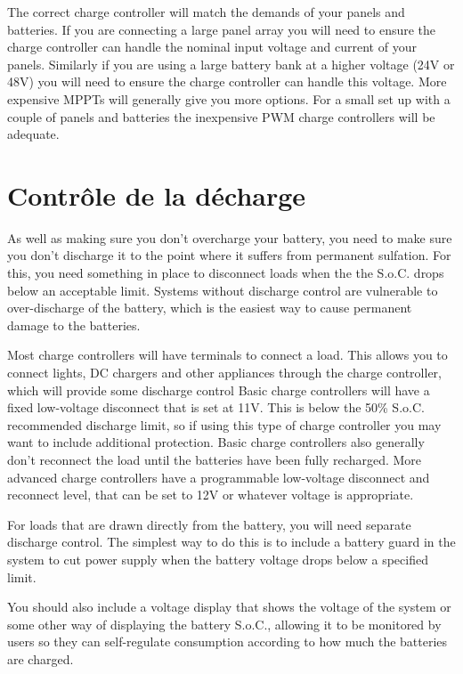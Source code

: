 \documentclass{article}
\theoremstyle{definition}
\theoremstyle{definition}
\theoremstyle{remark}
\begin{document}
    The correct charge controller will match the demands of your panels and batteries. If you are connecting a large panel array you will need to ensure the charge controller can handle the nominal input voltage and current of your panels. Similarly if you are using a large battery bank at a higher voltage (24V or 48V) you will need to ensure the charge controller can handle this voltage. More expensive MPPTs will generally give you more options. For a small set up with a couple of panels and batteries the inexpensive PWM charge controllers will be adequate. 
  


{\color{blue}\section{Contrôle de la décharge}} %
\label{sec:controle_de_la_decharge}

  As well as making sure you don’t overcharge your battery, you need to make sure you don’t discharge it to the point where it suffers from permanent sulfation. For this, you need something in place to disconnect loads when the the S.o.C. drops below an acceptable limit. Systems without discharge control are vulnerable to over-discharge of the battery, which is the easiest way to cause permanent damage to the batteries.

  Most charge controllers will have terminals to connect a load. This allows you to connect lights, DC chargers and other appliances through the charge controller, which will provide some discharge control Basic charge controllers will have a fixed low-voltage disconnect that is set at 11V. This is below the 50\% S.o.C. recommended discharge limit, so if using this type of charge controller you may want to include additional protection. Basic charge controllers also generally don't reconnect the load until the batteries have been fully recharged. More advanced charge controllers have a programmable low-voltage disconnect and reconnect level, that can be set to 12V or whatever voltage is appropriate.

  For loads that are drawn directly from the battery, you will need separate discharge control. The simplest way to do this is to include a battery guard in the system to cut power supply when the battery voltage drops below a specified limit. 

  You should also include a voltage display that shows the voltage of the system or some other way of displaying the battery S.o.C., allowing it to be monitored by users so they can self-regulate consumption according to how much the batteries are charged.
\end{document}
